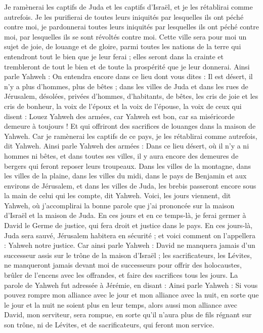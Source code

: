 \begin{multicols}{2}
Je ramènerai les captifs de Juda et les captifs d'Israël, et je les rétablirai comme autrefois.
Je les purifierai de toutes leurs iniquités par lesquelles ils ont péché contre moi, je pardonnerai toutes leurs iniquités par lesquelles ils ont péché contre moi, par lesquelles ils se sont révoltés contre moi.
Cette ville sera pour moi un sujet de joie, de louange et de gloire, parmi toutes les nations de la terre qui entendront tout le bien que je leur ferai ; elles seront dans la crainte et trembleront de tout le bien et de toute la prospérité que je leur donnerai.
Ainsi parle Yahweh : On entendra encore dans ce lieu dont vous dites : Il est désert, il n'y a plus d’hommes, plus de bêtes ; dans les villes de Juda et dans les rues de Jérusalem, désolées, privées d’hommes, d’habitants, de bêtes,
les cris de joie et les cris de bonheur, la voix de l'époux et la voix de l’épouse, la voix de ceux qui disent : Louez Yahweh des armées, car Yahweh est bon, car sa miséricorde demeure à toujours ! Et qui offriront des sacrifices de louanges dans la maison de Yahweh. Car je ramènerai les captifs de ce pays,  je les rétablirai comme autrefois, dit Yahweh.
Ainsi parle Yahweh des armées : Dans ce lieu désert, où il n'y a ni hommes ni bêtes, et dans toutes ses villes, il y aura encore des demeures de bergers qui feront reposer leurs troupeaux.
Dans les villes de la montagne, dans les villes de la plaine, dans les villes du midi, dans le pays de Benjamin et aux environs de Jérusalem, et dans les villes de Juda, les brebis passeront encore sous la main de celui qui les compte, dit Yahweh.
Voici, les jours viennent, dit Yahweh, où j’accomplirai la bonne parole que j'ai prononcée sur la maison d'Israël et la maison de Juda.
En ces jours et en ce temps-là, je ferai germer à David le Germe de justice, qui fera droit et justice dans le pays.
En ces jours-là, Juda sera sauvé, Jérusalem habitera en sécurité ; et voici comment on l’appellera : Yahweh notre justice.
Car ainsi parle Yahweh : David ne manquera jamais d’un successeur assis sur le trône de la maison d'Israël ;
les sacrificateurs, les Lévites, ne manqueront jamais devant moi de successeurs pour offrir des holocaustes, brûler de l’encens avec les offrandes, et faire des sacrifices tous les jours.
La parole de Yahweh fut adressée à Jérémie, en disant :
Ainsi parle Yahweh : Si vous pouvez rompre mon alliance avec le jour et mon alliance avec la nuit, en sorte que le jour et la nuit ne soient plus en leur temps,
alors aussi mon alliance avec David, mon serviteur, sera rompue, en sorte qu'il n'aura plus de fils régnant sur son trône, ni de Lévites, et de sacrificateurs, qui feront mon service.

\end{multicols}
